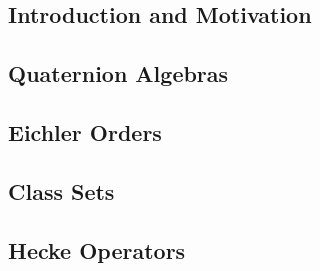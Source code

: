 
\subsection{Introduction and Motivation}


\subsection{Quaternion Algebras}

\subsection{Eichler Orders}

\subsection{Class Sets}

\subsection{Hecke Operators}



